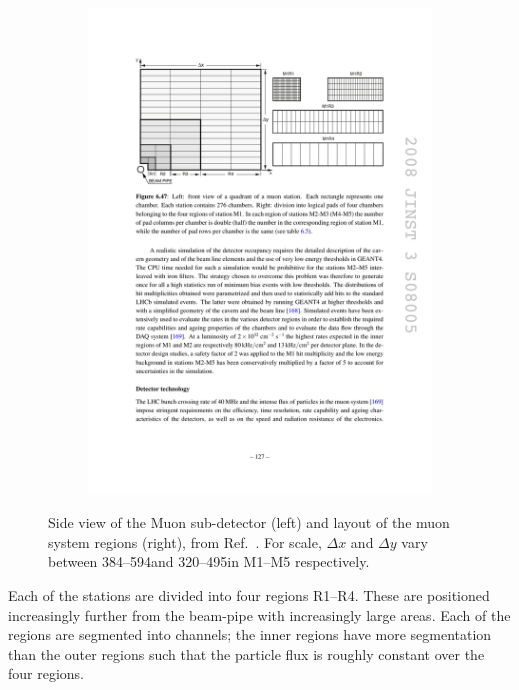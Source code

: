 \begin{figure}[!h]
\begin{subfigure}[m]{0.4\textwidth}
        \includegraphics[width=1.0\textwidth]{figs/Detector/muon_cells_layout.pdf}
    \end{subfigure}
    \caption{Side view of the Muon sub-detector (left) and layout of the muon system regions (right), from Ref.~\cite{Alves:2008zz}. For scale, $\Delta x$ and $\Delta y$ vary between 384--594\cm and 320--495\cm in M1--M5 respectively.  }
    \label{fig:Dec_muon_schematic}   
\end{figure}

Each of the stations are divided into four regions R1--R4. These are positioned increasingly further from the beam-pipe with increasingly large areas. Each of the regions are segmented into channels; the inner regions have more segmentation than the outer regions such that the particle flux is roughly constant over the four regions.   

